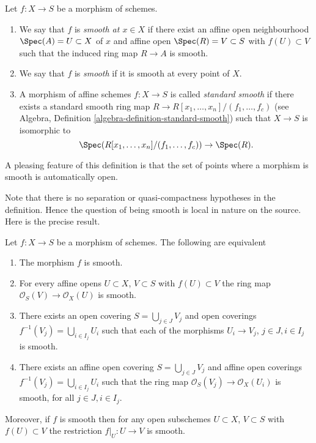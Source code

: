 \begin{definition}
\label{definition-smooth}
Let $f : X \to S$ be a morphism of schemes.
\begin{enumerate}
\item We say that $f$ is {\it smooth at $x \in X$} if
there exist an affine open neighbourhood $\Spec(A) = U \subset X$
of $x$ and affine open $\Spec(R) = V \subset S$
with $f(U) \subset V$ such that the induced ring map
$R \to A$ is smooth.
\item We say that $f$ is {\it smooth} if it is smooth at every point of $X$.
\item A morphism of affine schemes $f : X \to S$
is called {\it standard smooth} if there exists a standard smooth ring
map $R \to R[x_1, \ldots, x_n]/(f_1, \ldots, f_c)$ (see
Algebra, Definition \ref{algebra-definition-standard-smooth})
such that $X \to S$ is isomorphic to
$$
\Spec(R[x_1, \ldots, x_n]/(f_1, \ldots, f_c)) \to \Spec(R).
$$
\end{enumerate}
\end{definition}

\noindent
A pleasing feature of this definition is that the set of points
where a morphism is smooth is automatically open.

\medskip\noindent
Note that there is no separation or quasi-compactness hypotheses in the
definition. Hence the question of being smooth is local in nature on
the source. Here is the precise result.

\begin{lemma}
\label{lemma-smooth-characterize}
Let $f : X \to S$ be a morphism of schemes.
The following are equivalent
\begin{enumerate}
\item The morphism $f$ is smooth.
\item For every affine opens $U \subset X$, $V \subset S$
with $f(U) \subset V$ the ring map
$\mathcal{O}_S(V) \to \mathcal{O}_X(U)$ is smooth.
\item There exists an open covering $S = \bigcup_{j \in J} V_j$
and open coverings $f^{-1}(V_j) = \bigcup_{i \in I_j} U_i$ such
that each of the morphisms $U_i \to V_j$, $j\in J, i\in I_j$
is smooth.
\item There exists an affine open covering $S = \bigcup_{j \in J} V_j$
and affine open coverings $f^{-1}(V_j) = \bigcup_{i \in I_j} U_i$ such
that the ring map $\mathcal{O}_S(V_j) \to \mathcal{O}_X(U_i)$ is
smooth, for all $j\in J, i\in I_j$.
\end{enumerate}
Moreover, if $f$ is smooth then for
any open subschemes $U \subset X$, $V \subset S$ with $f(U) \subset V$
the restriction $f|_U : U \to V$ is smooth.
\end{lemma}

